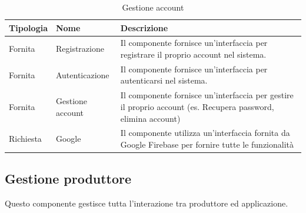 \begin{table}[htbp!]
    \centering
    \begin{tabularx}{0.9\textwidth}{ >{\centering\arraybackslash}X | >{\centering\arraybackslash}X | m{8cm}}
        \hline
        \textbf{Tipologia} & \textbf{Nome}  & \textbf{Descrizione}\\
        \hline
        Fornita & Registrazione & Il componente fornisce un'interfaccia per registrare il proprio account nel sistema.\\
        \hline
        Fornita &  Autenticazione & Il componente fornisce un'interfaccia per autenticarsi nel sistema.\\
        \hline
        Fornita &  Gestione account & Il componente fornisce un'interfaccia per gestire il proprio account (es. Recupera password, elimina account)\\
        \hline
        Richiesta &  Google & Il componente utilizza un'interfaccia fornita da Google Firebase per fornire tutte le funzionalità \\
        \hline
    \end{tabularx}
    \caption{Gestione account}
    \label{tab:gestione-account}
\end{table}


\subsection{Gestione produttore}
Questo componente gestisce tutta l'interazione tra produttore ed applicazione.


